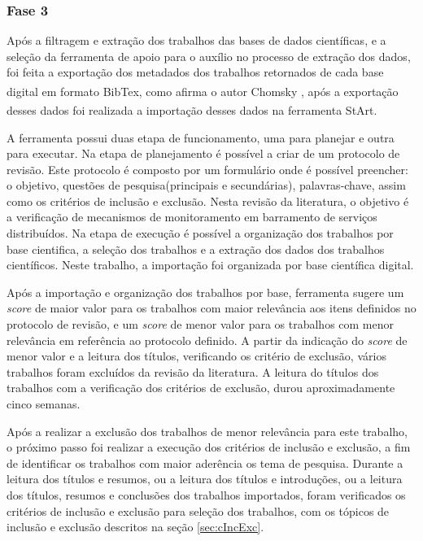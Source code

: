 \subsubsection{Fase 3} Após a filtragem e extração dos trabalhos das bases de dados científicas, e a seleção da ferramenta de apoio para o auxílio no processo de extração dos dados, foi feita a exportação dos metadados dos trabalhos retornados de cada base digital em formato BibTex\textsuperscript{\textregistered}, como afirma o autor Chomsky \cite{chomsky1969linguistica}, após a exportação desses dados foi realizada a importação desses dados na ferramenta \acrshort{StArt}\textsuperscript{\textregistered}. 

A ferramenta possui duas etapa de funcionamento, uma para planejar e outra para executar. Na etapa de planejamento é possível a criar de um protocolo de revisão. Este protocolo é composto por um formulário onde é possível preencher: o objetivo, questões de pesquisa(principais e secundárias), palavras-chave, assim como os critérios de inclusão e exclusão. Nesta revisão da literatura, o objetivo é a verificação de mecanismos de monitoramento em barramento de serviços distribuídos. Na etapa de execução é possível a organização dos trabalhos por base cientifica, a seleção dos trabalhos e a extração dos dados dos trabalhos científicos. Neste trabalho, a importação foi organizada por base científica digital. 

Após a importação e organização dos trabalhos por base, ferramenta sugere um \textit{score} de maior valor para os trabalhos com maior relevância aos itens definidos no protocolo de revisão, e um \textit{score} de menor valor para os trabalhos com menor relevância em referência ao protocolo definido. A partir da indicação do \textit{score} de menor valor e a leitura dos títulos, verificando os critério de exclusão, vários trabalhos foram excluídos da revisão da literatura. A leitura do títulos dos trabalhos com a verificação dos critérios de exclusão, durou aproximadamente cinco semanas. 

Após a realizar a exclusão dos trabalhos de menor relevância para este trabalho, o próximo passo foi realizar a execução dos critérios de inclusão e exclusão, a fim de identificar os trabalhos com maior aderência os tema de pesquisa. Durante a leitura dos títulos e resumos, ou a leitura dos títulos e introduções, ou a leitura dos títulos, resumos e conclusões dos trabalhos importados, foram verificados os critérios de inclusão e exclusão para seleção dos trabalhos, com os tópicos de inclusão e exclusão descritos na seção \ref{sec:cIncExc}. 

